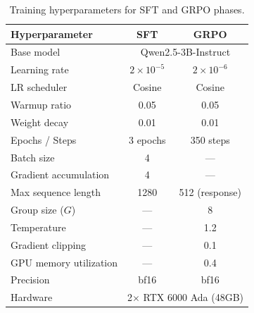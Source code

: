 \documentclass{article}
\begin{document}
\begin{table}[h]
\centering
\caption{Training hyperparameters for SFT and GRPO phases.}
\small
\begin{tabular}{lcc}
\toprule
\textbf{Hyperparameter} & \textbf{SFT} & \textbf{GRPO} \\
\midrule
Base model & \multicolumn{2}{c}{Qwen2.5-3B-Instruct} \\
Learning rate & $2 \times 10^{-5}$ & $2 \times 10^{-6}$ \\
LR scheduler & Cosine & Cosine \\
Warmup ratio & 0.05 & 0.05 \\
Weight decay & 0.01 & 0.01 \\
Epochs / Steps & 3 epochs & 350 steps \\
Batch size & 4 & --- \\
Gradient accumulation & 4 & --- \\
Max sequence length & 1280 & 512 (response) \\
Group size ($G$) & --- & 8 \\
Temperature & --- & 1.2 \\
Gradient clipping & --- & 0.1 \\
GPU memory utilization & --- & 0.4 \\
Precision & bf16 & bf16 \\
Hardware & \multicolumn{2}{c}{2$\times$ RTX 6000 Ada (48GB)} \\
\bottomrule
\end{tabular}
\end{table}
\end{document}
